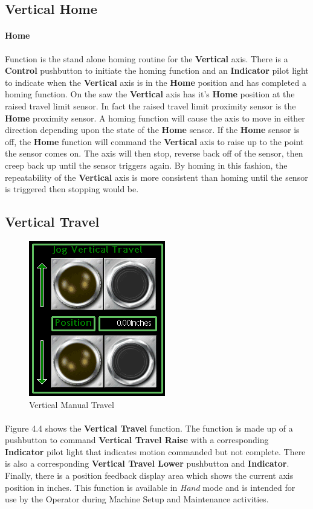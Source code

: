 \subsection{Vertical Home}\paragraph*{Home}Function is the stand alone homing routine for the \textbf{Vertical} axis. There is a \textbf{Control} pushbutton to initiate the homing function and an \textbf{Indicator} pilot light to indicate when the \textbf{Vertical} axis is in the \textbf{Home} position and has completed a homing function. On the saw the \textbf{Vertical} axis has it's \textbf{Home} position at the raised travel limit sensor. In fact the raised travel limit proximity sensor is the \textbf{Home} proximity sensor. A homing function will cause the axis to move in either direction depending upon the state of the \textbf{Home} sensor. If the \textbf{Home} sensor is off, the \textbf{Home} function will command the \textbf{Vertical} axis to raise up to the point the sensor comes on. The axis will then stop, reverse back off of the sensor, then creep back up until the sensor triggers again. By homing in this fashion, the repeatability of the \textbf{Vertical} axis is more consistent than homing until the sensor is triggered then stopping would be.
\subsection{Vertical Travel}
\begin{figure}
	\centering
	\includegraphics[width=.2\linewidth]{screen-captures/manual/vert-manual-command}
	\caption{Vertical Manual Travel}
	\label{fig:vert-manual-command}
\end{figure}
\paragraph*{}Figure 4.4 shows the \textbf{Vertical Travel} function. The function is made up of a pushbutton to command \textbf{Vertical Travel Raise} with a corresponding \textbf{Indicator} pilot light that indicates motion commanded but not complete. There is also a corresponding \textbf{Vertical Travel Lower} pushbutton and \textbf{Indicator}. Finally, there is a position feedback display area which shows the current axis position in inches. This function is available in \textit{Hand} mode and is intended for use by the Operator during Machine Setup and Maintenance activities. 
